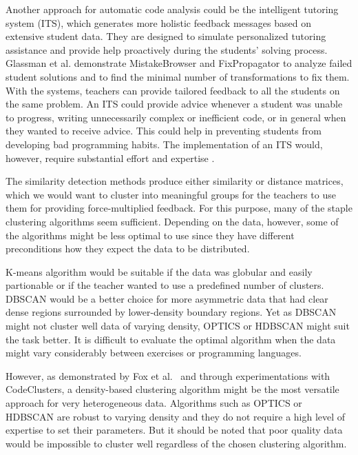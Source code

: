 Another approach for automatic code analysis could be the intelligent tutoring system (ITS), which generates more holistic feedback messages based on extensive student data. They are designed to simulate personalized tutoring assistance and provide help proactively during the students' solving process. Glassman et al. demonstrate MistakeBrowser and FixPropagator to analyze failed student solutions and to find the minimal number of transformations to fix them. With the systems, teachers can provide tailored feedback to all the students on the same problem\cite{glassman-reusable-feedback}. An ITS could provide advice whenever a student was unable to progress, writing unnecessarily complex or inefficient code, or in general when they wanted to receive advice. This could help in preventing students from developing bad programming habits. The implementation of an ITS would, however, require substantial effort and expertise \cite{glass-feature-engineering, its-2020}. 

The similarity detection methods produce either similarity or distance matrices, which we would want to cluster into meaningful groups for the teachers to use them for providing force-multiplied feedback. For this purpose, many of the staple clustering algorithms seem sufficient. Depending on the data, however, some of the algorithms might be less optimal to use since they have different preconditions how they expect the data to be distributed.

K-means algorithm would be suitable if the data was globular and easily partionable or if the teacher wanted to use a predefined number of clusters. DBSCAN would be a better choice for more asymmetric data that had clear dense regions surrounded by lower-density boundary regions. Yet as DBSCAN might not cluster well data of varying density, OPTICS or HDBSCAN might suit the task better. It is difficult to evaluate the optimal algorithm when the data might vary considerably between exercises or programming languages.

However, as demonstrated by Fox et al.~\cite{fox-clust-leverage-2015} and through experimentations with CodeClusters, a density-based clustering algorithm might be the most versatile approach for very heterogeneous data. Algorithms such as OPTICS or HDBSCAN are robust to varying density and they do not require a high level of expertise to set their parameters. But it should be noted that poor quality data would be impossible to cluster well regardless of the chosen clustering algorithm.

